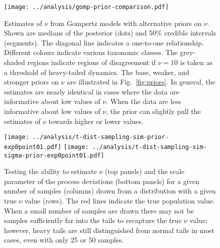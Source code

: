 \begin{figure}[htbp]
\begin{center}
\texttt{[image: ../analysis/gomp-prior-comparison.pdf]}
\caption{
Estimates of $\nu$ from Gompertz models with alternative priors on $\nu$. Shown are medians of the posterior (dots) and 50\% credible intervals (segments). The diagonal line indicates a one-to-one relationship. Different colours indicate various taxonomic classes. The grey-shaded regions indicate regions of disagreement if $\nu = 10$ is taken as a threshold of heavy-tailed dynamics. The base, weaker, and stronger priors on $\nu$ are illustrated in Fig.~\ref{fig:priors}. In general, the estimates are nearly identical in cases where the data are informative about low values of $\nu$. When the data are less informative about low values of $\nu$, the prior can slightly pull the estimates of $\nu$ towards higher or lower values.
}
\label{fig:alt-priors}
\end{center}
\end{figure}

\clearpage

\begin{figure}[htbp]
\begin{center}
\texttt{[image: ../analysis/t-dist-sampling-sim-prior-exp0point01.pdf]}
\texttt{[image: ../analysis/t-dist-sampling-sim-sigma-prior-exp0point01.pdf]}
\caption{
  Testing the ability to estimate $\nu$ (top panels) and the scale parameter of
  the process deviations (bottom panels) for a given number of samples (columns)
  drawn from a distribution with a given true $\nu$ value (rows). The red lines
  indicate the true population value. When a small number of samples are drawn
  there may not be samples sufficiently far into the tails to recapture the
  true $\nu$ value; however, heavy tails are still distinguished from normal
  tails in most cases, even with only 25 or 50 samples.
}
\label{fig:sim-nu}
\end{center}
\end{figure}

\clearpage

